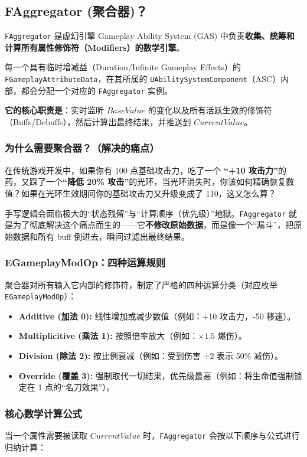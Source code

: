 \subsection{FAggregator (聚合器)？}\label{FAggregator}
\texttt{FAggregator} 是虚幻引擎 Gameplay Ability System (GAS) 中负责\textbf{收集、统筹和计算所有属性修饰符（Modifiers）的数学引擎}。

每一个具有临时增减益（Duration/Infinite Gameplay Effects）的 \texttt{FGameplayAttributeData}，在其所属的 \texttt{UAbilitySystemComponent}（ASC）内部，都会分配一个对应的 \texttt{FAggregator} 实例。

\textbf{它的核心职责是}：实时监听 $BaseValue$ 的变化以及所有活跃生效的修饰符（Buffs/Debuffs），然后计算出最终结果，并推送到 $CurrentValue$。

\subsubsection{为什么需要聚合器？（解决的痛点）}
在传统游戏开发中，如果你有 100 点基础攻击力，吃了一个 \textbf{“+10 攻击力”}的药，又踩了一个\textbf{“降低 20\% 攻击”}的光环，当光环消失时，你该如何精确恢复数值？如果在光环生效期间你的基础攻击力又升级变成了 110，这又怎么算？

手写逻辑会面临极大的“状态残留”与“计算顺序（优先级）”地狱。\texttt{FAggregator} 就是为了彻底解决这个痛点而生的——它\textbf{不修改原始数据}，而是像一个“漏斗”，把原始数据和所有 buff 倒进去，瞬间过滤出最终结果。

\subsubsection{EGameplayModOp：四种运算规则}
聚合器对所有输入它内部的修饰符，制定了严格的四种运算分类（对应枚举 \texttt{EGameplayModOp}）：

\begin{itemize}
	\item \textbf{Additive (加法 0):} 线性增加或减少数值（例如：+10 攻击力，-50 移速）。
	\item \textbf{Multiplicitive (乘法 1):} 按照倍率放大（例如：$\times 1.5$ 爆伤）。
	\item \textbf{Division (除法 2):} 按比例衰减（例如：受到伤害 $\div 2$ 表示 50\% 减伤）。
	\item \textbf{Override (覆盖 3):} 强制取代一切结果，优先级最高（例如：将生命值强制锁定在 1 点的“名刀效果”）。
\end{itemize}

\subsubsection{核心数学计算公式}
当一个属性需要被读取 $CurrentValue$ 时，\texttt{FAggregator} 会按以下顺序与公式进行归纳计算：

